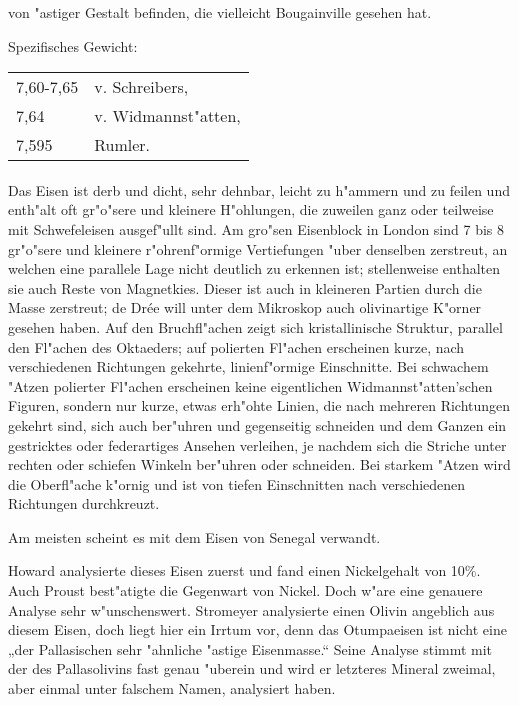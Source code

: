 \documentclass[a4paper, 11pt, oneside]{article}
\begin{document}
von "astiger Gestalt befinden, die vielleicht Bougainville gesehen hat.

Spezifisches Gewicht:  
\begin{table}[!ht]
    \centering
    \begin{tabular}{l l}
        7,60-7,65 & v. Schreibers,\\
        7,64 & v. Widmannst"atten,\\
        7,595 & Rumler.
    \end{tabular}
\end{table}
\paragraph{}
Das Eisen ist derb und dicht, sehr dehnbar, leicht zu h"ammern und zu feilen und enth"alt oft gr"o"sere und kleinere H"ohlungen, die zuweilen ganz oder teilweise mit Schwefeleisen ausgef"ullt sind. Am gro"sen Eisenblock in London sind 7 bis 8 gr"o"sere und kleinere r"ohrenf"ormige Vertiefungen "uber denselben zerstreut, an welchen eine parallele Lage nicht deutlich zu erkennen ist; stellenweise enthalten sie auch Reste von Magnetkies. Dieser ist auch in kleineren Partien durch die Masse zerstreut; de Drée will unter dem Mikroskop auch olivinartige K"orner gesehen haben. Auf den Bruchfl"achen zeigt sich kristallinische Struktur, parallel den Fl"achen des Oktaeders; auf polierten Fl"achen erscheinen kurze, nach verschiedenen Richtungen gekehrte, linienf"ormige Einschnitte. Bei schwachem "Atzen polierter Fl"achen erscheinen keine eigentlichen Widmannst"atten'schen Figuren, sondern nur kurze, etwas erh"ohte Linien, die nach mehreren Richtungen gekehrt sind, sich auch ber"uhren und gegenseitig schneiden und dem Ganzen ein gestricktes oder federartiges Ansehen verleihen, je nachdem sich die Striche unter rechten oder schiefen Winkeln ber"uhren oder schneiden. Bei starkem "Atzen wird die Oberfl"ache k"ornig und ist von tiefen Einschnitten nach verschiedenen Richtungen durchkreuzt.

Am meisten scheint es mit dem Eisen von Senegal verwandt.

Howard analysierte dieses Eisen zuerst und fand einen Nickelgehalt von 10\%. Auch Proust best"atigte die Gegenwart von Nickel. Doch w"are eine genauere Analyse sehr w"unschenswert. Stromeyer analysierte einen Olivin angeblich aus diesem Eisen, doch liegt hier ein Irrtum vor, denn das Otumpaeisen ist nicht eine „der Pallasischen sehr "ahnliche "astige Eisenmasse.“ Seine Analyse stimmt mit der des Pallasolivins fast genau "uberein und wird er letzteres Mineral zweimal, aber einmal unter falschem Namen, analysiert haben.
\end{document}
